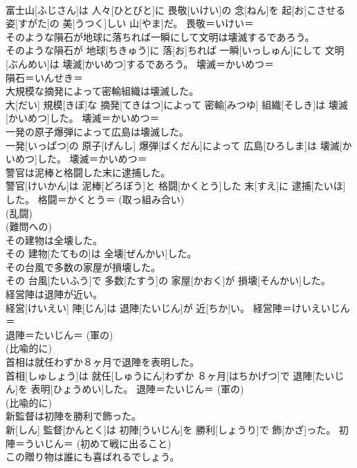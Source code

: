 \documentclass[8pt]{extreport}
\begin{document}
\begin{CJK}{UTF8}{min}
{\\	富士山[ふじさん]は 人々[ひとびと]に 畏敬[いけい]の 念[ねん]を 起[お]こさせる 姿[すがた]の 美[うつく]しい 山[やま]だ。	畏敬＝いけい＝ 
\\	そのような隕石が地球に落ちれば一瞬にして文明は壊滅するであろう。	
\\	そのような隕石が 地球[ちきゅう]に 落[お]ちれば 一瞬[いっしゅん]にして 文明[ぶんめい]は 壊滅[かいめつ]するであろう。	壊滅＝かいめつ＝ 
\\	隕石＝いんせき＝ 
\\	大規模な摘発によって密輸組織は壊滅した。	
\\	大[だい] 規模[きぼ]な 摘発[てきはつ]によって 密輸[みつゆ] 組織[そしき]は 壊滅[かいめつ]した。	壊滅＝かいめつ＝ 
\\	一発の原子爆弾によって広島は壊滅した。	
\\	一発[いっぱつ]の 原子[げんし] 爆弾[ばくだん]によって 広島[ひろしま]は 壊滅[かいめつ]した。	壊滅＝かいめつ＝ 
\\	警官は泥棒と格闘した末に逮捕した。	
\\	警官[けいかん]は 泥棒[どろぼう]と 格闘[かくとう]した 末[すえ]に 逮捕[たいほ]した。	格闘＝かくとう＝ (取っ組み合い) 
\\	(乱闘) 
\\	(難問への) 
\\	その建物は全壊した。	
\\	その 建物[たてもの]は 全壊[ぜんかい]した。	
\\	その台風で多数の家屋が損壊した。	
\\	その 台風[たいふう]で 多数[たすう]の 家屋[かおく]が 損壊[そんかい]した。	
\\	経営陣は退陣が近い。	
\\	経営[けいえい] 陣[じん]は 退陣[たいじん]が 近[ちか]い。	経営陣＝けいえいじん＝ 
\\	退陣＝たいじん＝ (軍の) 
\\	(比喩的に) 
\\	首相は就任わずか８ヶ月で退陣を表明した。	
\\	首相[しゅしょう]は 就任[しゅうにん]わずか ８ヶ月[はちかげつ]で 退陣[たいじん]を 表明[ひょうめい]した。	退陣＝たいじん＝ (軍の) 
\\	(比喩的に) 
\\	新監督は初陣を勝利で飾った。	
\\	新[しん] 監督[かんとく]は 初陣[ういじん]を 勝利[しょうり]で 飾[かざ]った。	初陣＝ういじん＝ (初めて戦に出ること) 
\\	この贈り物は誰にも喜ばれるでしょう。	
}
\end{CJK}
\end{document}
